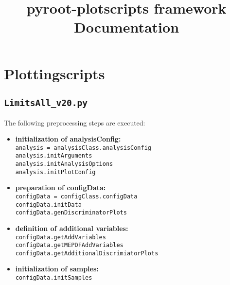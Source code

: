 \documentclass[12pt, a4paper]{article}
\title{{\Huge \textbf{pyroot-plotscripts framework}} \\[3cm]Documentation\\[1cm] }
\begin{document}
\maketitle
\newpage
\tableofcontents
\newpage

\section{Plottingscripts}

\subsection{\texttt{LimitsAll\_v20.py}}
The following preprocessing steps are executed:
		\begin{itemize}
			\item \textbf{initialization of analysisConfig:}\\
				\texttt{analysis = analysisClass.analysisConfig}\\
				\texttt{analysis.initArguments}\\
				\texttt{analysis.initAnalysisOptions}\\
				\texttt{analysis.initPlotConfig}
				
			\item \textbf{preparation of configData:}\\
				\texttt{configData = configClass.configData}\\
				\texttt{configData.initData}\\
				\texttt{configData.genDiscriminatorPlots}
				
			\item \textbf{definition of additional variables:}\\
				\texttt{configData.getAddVariables}\\
				\texttt{configData.getMEPDFAddVariables}\\
				\texttt{configData.getAdditionalDiscrimiatorPlots}
				
			\item \textbf{initialization of samples:}\\
				\texttt{configData.initSamples}
				
		\end{itemize}
\end{document}
